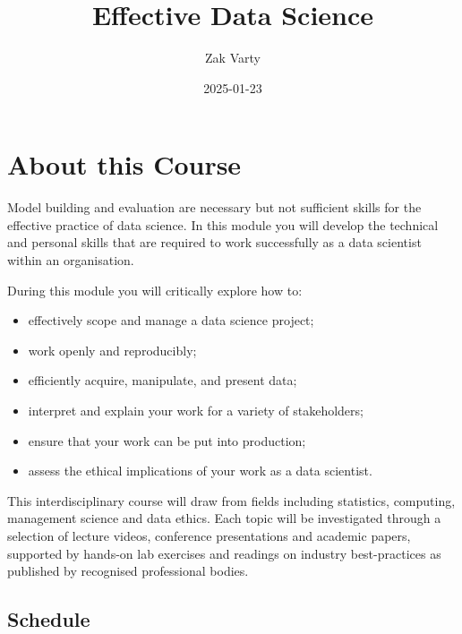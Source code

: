 \documentclass[
  letterpaper,
  DIV=11,
  numbers=noendperiod]{scrreprt}
\title{Effective Data Science}
\author{Zak Varty}
\date{2025-01-23}
\providecommand{\tightlist}{%
  \setlength{\itemsep}{0pt}\setlength{\parskip}{0pt}}\usepackage{longtable,booktabs,array}
\renewcommand*\contentsname{Table of contents}
\newcommand\contentsname{Table of contents}
\begin{document}
\maketitle

\renewcommand*\contentsname{Table of contents}
{
\hypersetup{linkcolor=}
\setcounter{tocdepth}{2}
\tableofcontents
}

\chapter*{About this Course}\label{about-this-course}


Model building and evaluation are necessary but not sufficient skills
for the effective practice of data science. In this module you will
develop the technical and personal skills that are required to work
successfully as a data scientist within an organisation.

During this module you will critically explore how to:

\begin{itemize}
\tightlist
\item
  effectively scope and manage a data science project;
\item
  work openly and reproducibly;
\item
  efficiently acquire, manipulate, and present data;
\item
  interpret and explain your work for a variety of stakeholders;
\item
  ensure that your work can be put into production;
\item
  assess the ethical implications of your work as a data scientist.
\end{itemize}

This interdisciplinary course will draw from fields including
statistics, computing, management science and data ethics. Each topic
will be investigated through a selection of lecture videos, conference
presentations and academic papers, supported by hands-on lab exercises
and readings on industry best-practices as published by recognised
professional bodies.

\section*{Schedule}\label{schedule}
\end{document}
